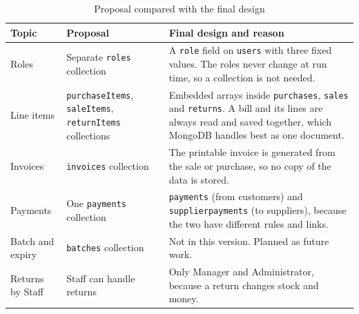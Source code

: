 \documentclass[11pt,a4paper]{article}
\newcommand{\code}[1]{\texttt{#1}}
\begin{document}
\begin{table}[H]
  \centering
  \caption{Proposal compared with the final design}
  \begin{tabularx}{\textwidth}{@{}P{2.7cm}P{4.4cm}Y@{}}
    \toprule
    \textbf{Topic} & \textbf{Proposal} & \textbf{Final design and reason} \\
    \midrule
    Roles & Separate \code{roles} collection & A \code{role} field on \code{users} with three fixed values.
      The roles never change at run time, so a collection is not needed. \\
    Line items & \code{purchaseItems}, \code{saleItems}, \code{returnItems} collections &
      Embedded arrays inside \code{purchases}, \code{sales} and \code{returns}. A bill and its lines
      are always read and saved together, which MongoDB handles best as one document. \\
    Invoices & \code{invoices} collection & The printable invoice is generated from the sale or purchase,
      so no copy of the data is stored. \\
    Payments & One \code{payments} collection & \code{payments} (from customers) and
      \code{supplierpayments} (to suppliers), because the two have different rules and links. \\
    Batch and expiry & \code{batches} collection & Not in this version. Planned as future work. \\
    Returns by Staff & Staff can handle returns & Only Manager and Administrator, because a return
      changes stock and money. \\
    \bottomrule
  \end{tabularx}
\end{table}
\end{document}
